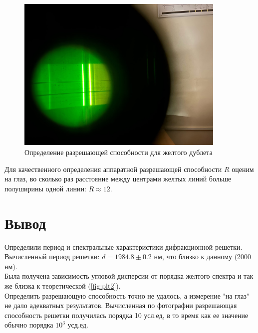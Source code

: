 \begin{figure}[h!]
    \centering
    \includegraphics[width=10cm]{images/getR.jpg}
    \caption{Определение разрешающей способности для желтого дублета}
\end{figure}

Для качественного определения аппаратной разрешающей способности $R$ оценим на глаз, во сколько раз расстояние между центрами желтых линий больше полуширины одной линии: $R \approx 12$.

\section*{Вывод}

\indent Определили период и спектральные характеристики дифракционной решетки. Вычисленный период решетки: $d = 1984.8 \pm 0.2$ нм, что близко к данному (2000 нм). \\
\indent Была получена зависимость угловой дисперсии от порядка желтого спектра и так же близка к теоретической (\ref{fig:plt2}). \\\indent Определить разрешающую способность точно не удалось, а измерение "на глаз" не дало адекватных результатов. Вычисленная по фотографии разрешающая способность решетки получилась порядка 10 усл.ед, в то время как ее значение обычно порядка $10^3$ усд.ед.\\\indent














